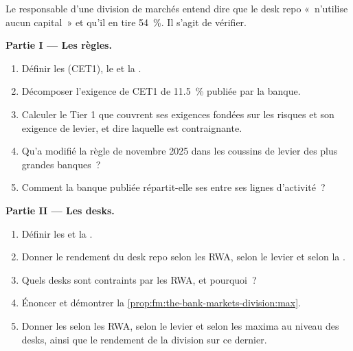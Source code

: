 \begin{problem}\label{pb:fm:the-bank-markets-division:1}
Le responsable d'une division de marchés entend dire que le desk repo «~n'utilise aucun capital~» et qu'il en tire 54~\%. Il s'agit de vérifier.

\medskip\noindent\textbf{Partie I --- Les règles.}
\begin{enumerate}
\item Définir les  (CET1), le  et la .
\item Décomposer l'exigence de CET1 de 11.5~\% publiée par la banque.
\item Calculer le Tier 1 que couvrent ses exigences fondées sur les risques et son exigence de levier, et dire laquelle est contraignante.
\item Qu'a modifié la règle de novembre 2025 dans les coussins de levier des plus grandes banques~?
\item Comment la banque publiée répartit-elle ses  entre ses lignes d'activité~?
\end{enumerate}

\medskip\noindent\textbf{Partie II --- Les desks.}
\begin{enumerate}[resume]
\item Définir les  et la .
\item Donner le rendement du desk repo selon les RWA, selon le levier et selon la .
\item Quels desks sont contraints par les RWA, et pourquoi~?
\item Énoncer et démontrer la \cref{prop:fm:the-bank-markets-division:max}.
\item Donner les  selon les RWA, selon le levier et selon les maxima au niveau des desks, ainsi que le rendement de la division sur ce dernier.
\end{enumerate}


\end{problem}
